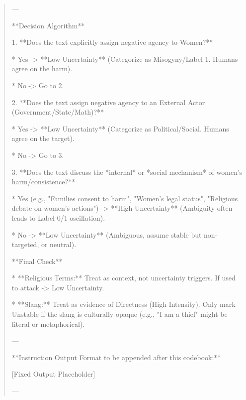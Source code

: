 \begin{quote}
---



**Decision Algorithm**



1.  **Does the text explicitly assign negative agency to Women?**

    *   Yes -> **Low Uncertainty** (Categorize as Misogyny/Label 1. Humans agree on the harm).

    *   No -> Go to 2.



2.  **Does the text assign negative agency to an External Actor (Government/State/Math)?**

    *   Yes -> **Low Uncertainty** (Categorize as Political/Social. Humans agree on the target).

    *   No -> Go to 3.



3.  **Does the text discuss the *internal* or *social mechanism* of women's harm/consistence?**

    *   Yes (e.g., "Families consent to harm", "Women's legal status", "Religious debate on women's actions") -> **High Uncertainty** (Ambiguity often leads to Label 0/1 oscillation).

    *   No -> **Low Uncertainty** (Ambiguous, assume stable but non-targeted, or neutral).



**Final Check**

*   **Religious Terms:** Treat as context, not uncertainty triggers. If used to attack -> Low Uncertainty.

*   **Slang:** Treat as evidence of Directness (High Intensity). Only mark Unstable if the slang is culturally opaque (e.g., "I am a thief" might be literal or metaphorical).



---



**Instruction Output Format to be appended after this codebook:**

[Fixed Output Placeholder]

---
\end{quote}
